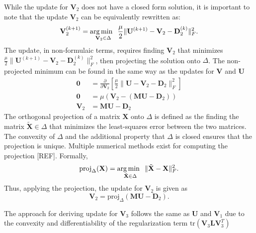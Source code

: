 While the update for $\mathbf{V}_2$ does not have a closed form solution, it is important to note that the update $\mathbf{V}_2$ can be equivalently rewritten as:
$$
\mathbf{V}_2^{(k+1)} = \operatorname*{arg\,min \;\;}_{\mathbf{V}_2 \in \Delta} \frac{\mu}{2} \|\mathbf{U}^{(k+1)} - \mathbf{V}_2 - \mathbf{D}_2^{(k)}\|_F^2.
$$
The update, in non-formulaic terms, requires finding $\mathbf{V}_2$ that minimizes $\frac{\mu}{2} \|\mathbf{U}^{(k+1)} - \mathbf{V}_2 - \mathbf{D}_2^{(k)}\|_F^2$, then projecting the solution onto $\Delta$. 
The non-projected minimum can be found in the same way as the updates for $\mathbf{V}$ and $\mathbf{U}$
\begin{equation*}
  \begin{aligned}
    \mathbf{0} &= \frac{\partial}{\partial \mathbf{V}_2} \left[\frac{\mu}{2} \|\mathbf{U} - \mathbf{V}_2 - \mathbf{D}_2\|_F^2\right]
    \\
    \mathbf{0} &= \mu(\mathbf{V}_2 - (\mathbf{MU} - \mathbf{D}_2))
    \\
    \mathbf{V}_2 &= \mathbf{MU} - \mathbf{D}_2
  \end{aligned}
\end{equation*}
The orthogonal projection of a matrix $\mathbf{X}$ onto $\Delta$ is defined as the finding the matrix $\tilde{\mathbf{X}} \in \Delta$ that minimizes the least-squares error between the two matrices. The convexity of $\Delta$ and the additional property that $\Delta$ is closed ensures that the projection is unique. Multiple numerical methods exist for computing the projection [REF]. Formally,
\begin{equation*}
  \text{proj}_\Delta(\mathbf{X}) = \operatorname*{arg\,min \;\;}_{\tilde{\mathbf{X}} \in \Delta} \|\tilde{\mathbf{X}} - \mathbf{X}\|_F^2.
\end{equation*}
Thus, applying the projection, the update for $\mathbf{V}_2$ is given as
\begin{equation*}
  \mathbf{V}_2 = \text{proj}_\Delta(\mathbf{MU} - \mathbf{D}_2).
\end{equation*}

The approach for deriving update for $\mathbf{V}_3$ follows the same as $\mathbf{U}$ and $\mathbf{V}_1$ due to the convexity and differentiability of the regularization term $\text{tr}(\mathbf{V}_3\mathbf{L}\mathbf{V}_3^T)$ 